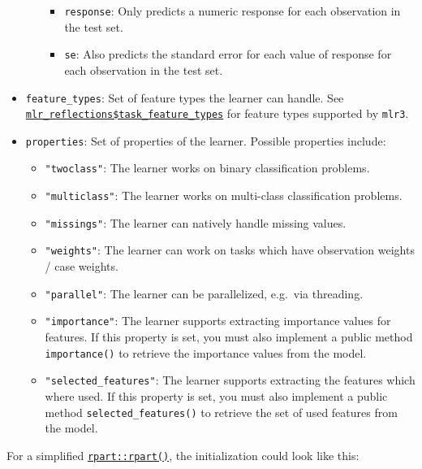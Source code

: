 \documentclass[]{scrbook}
\providecommand{\tightlist}{%
  \setlength{\itemsep}{0pt}\setlength{\parskip}{0pt}}
\begin{document}
\begin{itemize}
\begin{itemize}
    \begin{itemize}
    \tightlist
    \item
      \texttt{response}: Only predicts a numeric response for each observation in the test set.
    \item
      \texttt{se}: Also predicts the standard error for each value of response for each observation in the test set.
    \end{itemize}
  \end{itemize}
\item
  \texttt{feature\_types}: Set of feature types the learner can handle.
  See \href{https://mlr3.mlr-org.com/reference/mlr_reflections.html}{\texttt{mlr\_reflections\$task\_feature\_types}} for feature types supported by \texttt{mlr3}.
\item
  \texttt{properties}: Set of properties of the learner. Possible properties include:

  \begin{itemize}
  \tightlist
  \item
    \texttt{"twoclass"}: The learner works on binary classification problems.
  \item
    \texttt{"multiclass"}: The learner works on multi-class classification problems.
  \item
    \texttt{"missings"}: The learner can natively handle missing values.
  \item
    \texttt{"weights"}: The learner can work on tasks which have observation weights / case weights.
  \item
    \texttt{"parallel"}: The learner can be parallelized, e.g.~via threading.
  \item
    \texttt{"importance"}: The learner supports extracting importance values for features.
    If this property is set, you must also implement a public method \texttt{importance()} to retrieve the importance values from the model.
  \item
    \texttt{"selected\_features"}: The learner supports extracting the features which where used.
    If this property is set, you must also implement a public method \texttt{selected\_features()} to retrieve the set of used features from the model.
  \end{itemize}
\end{itemize}

For a simplified \href{https://www.rdocumentation.org/packages/rpart/topics/rpart}{\texttt{rpart::rpart()}}, the initialization could look like this:
\end{document}
